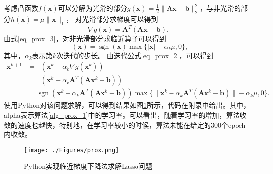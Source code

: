 \begin{solution}
    考虑凸函数$f(\bm{\bm{x}})$可以分解为光滑的部分$g(\bm{x})=\frac{1}{2}\|\bm{A} \bm{x}-\bm{b}\|_{2}^{2}$，与非光滑的部分$h(\bm{x})=\mu\|\bm{x}\|_{1}$，
    对光滑部分求梯度可以得到
    \begin{equation*}
        \nabla g(\bm{x}) = \bm{A}^{T}(\bm{A} \bm{x}-\bm{b}).
    \end{equation*}
    由式\ref{eq_prox_3}，对非光滑部分求临近算子可以得到
    \begin{equation*}
        \mathop{\mathrm{prox_{\alpha_{k}h}}}(\bm{x}) = \mathop{\mathrm{sgn}}(\bm{x})\max\{|\bm{x}|-\alpha_{k}\mu, 0\},
    \end{equation*}
    其中，$\alpha_{k}$表示第$k$次迭代的步长。
    由迭代公式\ref{eq_prox_2}，可以得到
    \begin{equation}
        \begin{split}
            \bm{x}^{k+1} &= \mathop{\mathrm{prox_{\alpha_{k}h}}}(\bm{x}^{k} - \alpha_{k}\nabla g(\bm{x}^{k})) \\
            &=\mathop{\mathrm{prox_{\alpha_{k}h}}}(\bm{x}^{k} - \alpha_{k}\bm{A}^{T}(\bm{A} \bm{x}^{k}-\bm{b})) \\
            &=\mathop{\mathrm{sgn}}(\bm{x}^{k} - \alpha_{k}\bm{A}^{T}(\bm{A} \bm{x}^{k}-\bm{b}))\max\{\|\bm{x}^{k} - \alpha_{k}\bm{A}^{T}(\bm{A} \bm{x}^{k}-\bm{b})\|-\alpha_{k}\mu, 0\} .
        \end{split}
        \nonumber
    \end{equation}
    使用Python对该问题求解，可以得到结果如图\ref{figure_prox}所示，代码在附录中给出。其中，alpha表示算法\ref{alg_prox_1}中的学习率。可以看出，随着学习率的增加，算法收敛的速度也越快，特别地，在学习率较小的时候，算法未能在给定的300个epoch内收敛。
    \begin{figure}[hbtp]
        \centering
        \texttt{[image: ./Figures/prox.png]}
        \caption{Python实现临近梯度下降法求解Lasso问题}
        \label{figure_prox}
    \end{figure}
\end{solution}